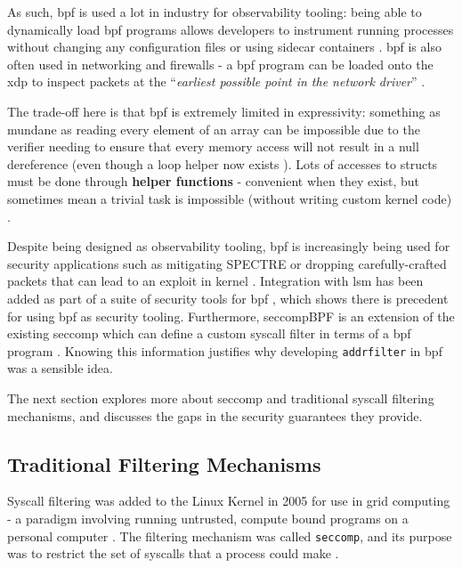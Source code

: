 As such, \ac{bpf} is used a lot in industry for observability tooling: being able to
dynamically load \ac{bpf} programs allows developers to instrument running processes
without changing any configuration files or using sidecar containers \cite{SIDECAR}.
\ac{bpf} is also often used in networking and firewalls \cite{LINUX_NETWORKING_OBSERVABILITY} - a \ac{bpf} program can
be loaded onto the \ac{xdp} to inspect packets at the ``\textit{earliest possible
point in the network driver}'' \cite{CILIUM_BPF_XDP_INTRO}. 

The trade-off here is that \ac{bpf} is extremely limited in expressivity:
something as mundane as reading every element of an array can be impossible due
to the verifier needing to ensure that every memory access will not result in 
a null dereference (even though a loop helper now exists \cite{BPF_LOOP_COMMIT}). Lots of accesses to structs must be done through
\textbf{helper functions} - convenient when they exist, but sometimes mean a
trivial task is impossible (without writing custom kernel code) \cite{bpf_kfuncs_docs}.

Despite being designed as observability tooling, \ac{bpf} is increasingly being
used for security applications such as mitigating SPECTRE
\cite{SPECTRE_BPF_MITIGATION} or dropping carefully-crafted packets that can
lead to an exploit in kernel \cite{BPF_PACKET_MITIGATION}. Integration with
\ac{lsm} has been added as part of a suite of security tools for \ac{bpf}
\cite{StarovoitovBPFSecurity}, which
shows there is precedent for using \ac{bpf} as security tooling. Furthermore,
seccompBPF is an extension of the existing seccomp which can define a custom
syscall filter in terms of a \ac{bpf} program \cite{seccompBPF}. Knowing this information
justifies why developing \texttt{addrfilter} in \ac{bpf} was a sensible idea.

The next section explores more about seccomp and traditional syscall
filtering mechanisms, and discusses the gaps in the security guarantees they
provide.

\subsection{Traditional Filtering Mechanisms}

Syscall filtering was added to the Linux Kernel in 2005 for use in grid
computing - a paradigm involving running untrusted, compute bound programs on a
personal computer \cite{GRID_COMPUTING_INTRO}. The
filtering mechanism was called \texttt{seccomp}, and its purpose was to
restrict the set of syscalls that a process could make \cite{arcangeli_seccomp_2005}.

